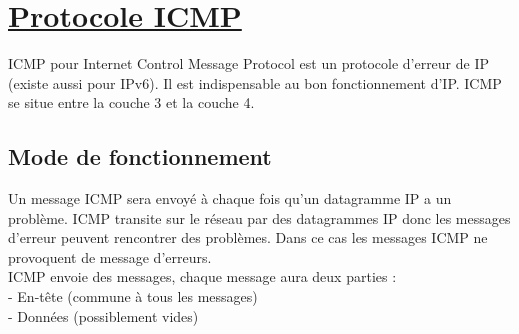 \documentclass{article}
\begin{document}
\section{\underline{Protocole ICMP}}
ICMP pour Internet Control Message Protocol est un protocole d'erreur de IP (existe aussi pour IPv6). Il est indispensable au bon fonctionnement d'IP. ICMP se situe entre la couche 3 et la couche 4.
\subsection{Mode de fonctionnement}
Un message ICMP sera envoyé à chaque fois qu'un datagramme IP a un problème. ICMP transite sur le réseau par des datagrammes IP donc les messages d'erreur peuvent rencontrer des problèmes. Dans ce cas les messages ICMP ne provoquent de message d'erreurs. \\
ICMP envoie des messages, chaque message aura deux parties : \\
- En-tête (commune à tous les messages) \\
- Données (possiblement vides) \\
\end{document}
